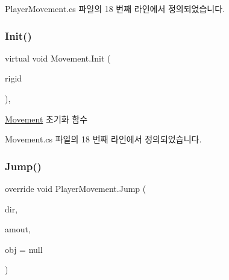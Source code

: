 Player\+Movement.\+cs 파일의 18 번째 라인에서 정의되었습니다.


\begin{DoxyCode}{0}

\end{DoxyCode}
\mbox{\label{class_movement_a1c50c07edbe274e1cf55253e87506684}} 
\subsubsection{\texorpdfstring{Init()}{Init()}\hspace{0.1cm}{\footnotesize\ttfamily [2/2]}}
{\footnotesize\ttfamily virtual void Movement.\+Init (\begin{DoxyParamCaption}\item[{Rigidbody2D}]{rigid }\end{DoxyParamCaption})\hspace{0.3cm}{\ttfamily [virtual]}, {\ttfamily [inherited]}}



\mbox{\hyperlink{class_movement}{Movement}} 초기화 함수 



Movement.\+cs 파일의 18 번째 라인에서 정의되었습니다.


\begin{DoxyCode}{0}

\end{DoxyCode}
\mbox{\label{class_player_movement_a64ce92029a6d91f12d23332bdd44a6ab}} 
\subsubsection{\texorpdfstring{Jump()}{Jump()}\hspace{0.1cm}{\footnotesize\ttfamily [1/2]}}
{\footnotesize\ttfamily override void Player\+Movement.\+Jump (\begin{DoxyParamCaption}\item[{Vector2}]{dir,  }\item[{float}]{amout,  }\item[{Game\+Object}]{obj = {\ttfamily null} }\end{DoxyParamCaption})}



